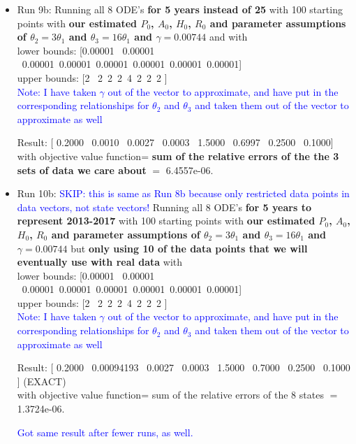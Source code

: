 \documentclass[12pt]{article}
\begin{document}
\begin{itemize}
\item Run 9b: Running all 8 ODE's \textbf{for 5 years instead of 25}  with 100 starting points with \textbf{our estimated $P_0$, $A_0$, $H_0$, $R_0$ and parameter assumptions of $\theta_2=3 \theta_1$ and $\theta_3=16\theta_1$ and $\gamma=0.00744$} and with \\
lower bounds: [0.00001  \ 0.00001 \ 0.00001\ 0.00001\ 0.00001\ 0.00001\ 0.00001\ 0.00001] \\
upper bounds: [2 \ 2\  2\  2\  4\  2\  2\   2 ] \\
\textcolor{blue}{Note: I have taken $\gamma$ out of the vector to approximate, and have put in the corresponding relationships for $\theta_2$ and $\theta_3$ and taken them out of the vector to approximate as well}

Result: [  0.2000 \    0.0010 \   0.0027   \ 0.0003   \ 1.5000 \   0.6997  \  0.2500  \  0.1000] \\
with objective value function= \textbf{sum of the relative errors of the the 3 sets of data we care about} $=$    6.4557e-06. \\



\item Run 10b: \textcolor{blue}{SKIP: this is same as Run 8b because only restricted data points in data vectors, not state vectors!} Running all 8 ODE's \textbf{for 5 years to represent 2013-2017} with 100 starting points with \textbf{our estimated $P_0$, $A_0$, $H_0$, $R_0$ and parameter assumptions of $\theta_2=3 \theta_1$ and $\theta_3=16\theta_1$ and $\gamma=0.00744$} but  \textbf{only using 10 of the data points that we will eventually use with real data} with \\
lower bounds: [0.00001  \ 0.00001 \ 0.00001\ 0.00001\ 0.00001\ 0.00001\ 0.00001\ 0.00001] \\
upper bounds: [2 \ 2\  2\  2\  4\  2\  2\   2 ] \\
\textcolor{blue}{Note: I have taken $\gamma$ out of the vector to approximate, and have put in the corresponding relationships for $\theta_2$ and $\theta_3$ and taken them out of the vector to approximate as well}

Result: [ 0.2000  \  0.00094193 \   0.0027  \  0.0003 \   1.5000 \   0.7000  \  0.2500 \   0.1000 ] (EXACT) \\
with objective value function= sum of the relative errors of the 8 states $=$    1.3724e-06.

\textcolor{blue}{Got same result after fewer runs, as well.}



\end{itemize}
\end{document}
